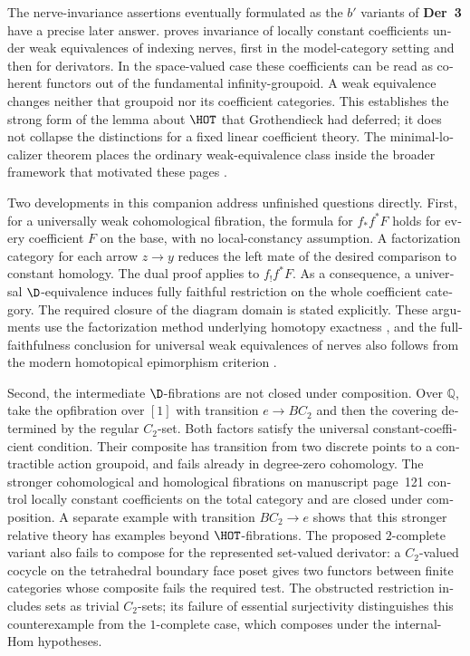 \begin{otherlanguage}{english}
The nerve-invariance assertions eventually formulated as the $b'$ variants of \textbf{Der~3} have a precise later answer. \citet[Theorem~1.3 and Corollary~3.8]{Cisinski2009LocallyConstant} proves invariance of locally constant coefficients under weak equivalences of indexing nerves, first in the model-category setting and then for derivators. In the space-valued case these coefficients can be read as coherent functors out of the fundamental infinity-groupoid. A weak equivalence changes neither that groupoid nor its coefficient categories. This establishes the strong form of the lemma about $\HOT$ that Grothendieck had deferred; it does not collapse the distinctions for a fixed linear coefficient theory. The minimal-localizer theorem places the ordinary weak-equivalence class inside the broader framework that motivated these pages \citep[Theorem~2.2.11]{Cisinski2004Minimal}.

Two developments in this companion address unfinished questions directly. First, for a universally weak cohomological fibration, the formula for $f_*f^*F$ holds for every coefficient $F$ on the base, with no local-constancy assumption. A factorization category for each arrow $z\to y$ reduces the left mate of the desired comparison to constant homology. The dual proof applies to $f_!f^*F$. As a consequence, a universal $\D$-equivalence induces fully faithful restriction on the whole coefficient category. The required closure of the diagram domain is stated explicitly. These arguments use the factorization method underlying homotopy exactness \citep[Theorem~3.8]{GrothPontoShulman2014}, and the full-faithfulness conclusion for universal weak equivalences of nerves also follows from the modern homotopical epimorphism criterion \citep[Theorem~6.10]{GrothStovicek2016Trees}.

Second, the intermediate $\D$-fibrations are not closed under composition. Over $\mathbb Q$, take the opfibration over $[1]$ with transition $e\to BC_2$ and then the covering determined by the regular $C_2$-set. Both factors satisfy the universal constant-coefficient condition. Their composite has transition from two discrete points to a contractible action groupoid, and fails already in degree-zero cohomology. The stronger cohomological and homological fibrations on manuscript page~121 control locally constant coefficients on the total category and are closed under composition. A separate example with transition $BC_2\to e$ shows that this stronger relative theory has examples beyond $\HOT$-fibrations. The proposed $2$-complete variant also fails to compose for the represented set-valued derivator: a $C_2$-valued cocycle on the tetrahedral boundary face poset gives two functors between finite categories whose composite fails the required test. The obstructed restriction includes sets as trivial $C_2$-sets; its failure of essential surjectivity distinguishes this counterexample from the $1$-complete case, which composes under the internal-Hom hypotheses.


\end{otherlanguage}
